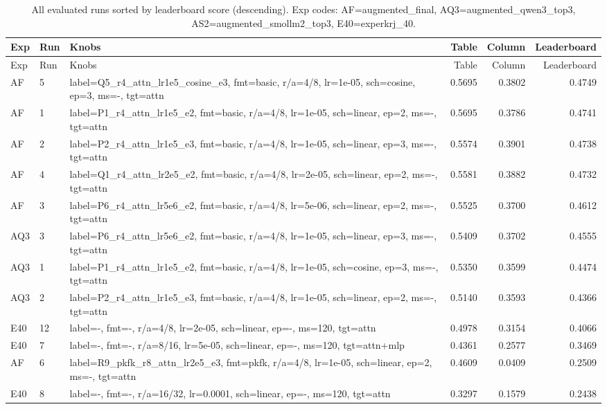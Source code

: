 \setlength{\LTleft}{0pt}
\setlength{\LTright}{0pt}
\small
\begin{longtable}{@{}llp{1.9in}rrr@{}}
\caption{All evaluated runs sorted by leaderboard score (descending). Exp codes: AF=augmented\_final, AQ3=augmented\_qwen3\_top3, AS2=augmented\_smollm2\_top3, E40=experkrj\_40.}\label{tab:all-runs-sorted}\\
\toprule
Exp & Run & Knobs & Table & Column & Leaderboard \\
\midrule
\endfirsthead
\toprule
Exp & Run & Knobs & Table & Column & Leaderboard \\
\midrule
\endhead
AF & 5 & label=Q5\_r4\_attn\_lr1e5\_cosine\_e3, fmt=basic, r/a=4/8, lr=1e-05, sch=cosine, ep=3, ms=-, tgt=attn & 0.5695 & 0.3802 & 0.4749 \\
AF & 1 & label=P1\_r4\_attn\_lr1e5\_e2, fmt=basic, r/a=4/8, lr=1e-05, sch=linear, ep=2, ms=-, tgt=attn & 0.5695 & 0.3786 & 0.4741 \\
AF & 2 & label=P2\_r4\_attn\_lr1e5\_e3, fmt=basic, r/a=4/8, lr=1e-05, sch=linear, ep=3, ms=-, tgt=attn & 0.5574 & 0.3901 & 0.4738 \\
AF & 4 & label=Q1\_r4\_attn\_lr2e5\_e2, fmt=basic, r/a=4/8, lr=2e-05, sch=linear, ep=2, ms=-, tgt=attn & 0.5581 & 0.3882 & 0.4732 \\
AF & 3 & label=P6\_r4\_attn\_lr5e6\_e2, fmt=basic, r/a=4/8, lr=5e-06, sch=linear, ep=2, ms=-, tgt=attn & 0.5525 & 0.3700 & 0.4612 \\
AQ3 & 3 & label=P6\_r4\_attn\_lr5e6\_e2, fmt=basic, r/a=4/8, lr=1e-05, sch=linear, ep=3, ms=-, tgt=attn & 0.5409 & 0.3702 & 0.4555 \\
AQ3 & 1 & label=P1\_r4\_attn\_lr1e5\_e2, fmt=basic, r/a=4/8, lr=1e-05, sch=cosine, ep=3, ms=-, tgt=attn & 0.5350 & 0.3599 & 0.4474 \\
AQ3 & 2 & label=P2\_r4\_attn\_lr1e5\_e3, fmt=basic, r/a=4/8, lr=1e-05, sch=linear, ep=2, ms=-, tgt=attn & 0.5140 & 0.3593 & 0.4366 \\
E40 & 12 & label=-, fmt=-, r/a=4/8, lr=2e-05, sch=linear, ep=-, ms=120, tgt=attn & 0.4978 & 0.3154 & 0.4066 \\
E40 & 7 & label=-, fmt=-, r/a=8/16, lr=5e-05, sch=linear, ep=-, ms=120, tgt=attn+mlp & 0.4361 & 0.2577 & 0.3469 \\
AF & 6 & label=R9\_pkfk\_r8\_attn\_lr2e5\_e3, fmt=pkfk, r/a=4/8, lr=1e-05, sch=linear, ep=2, ms=-, tgt=attn & 0.4609 & 0.0409 & 0.2509 \\
E40 & 8 & label=-, fmt=-, r/a=16/32, lr=0.0001, sch=linear, ep=-, ms=120, tgt=attn & 0.3297 & 0.1579 & 0.2438 \\

\end{longtable}
